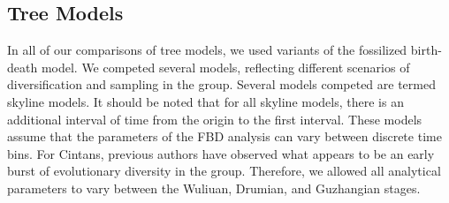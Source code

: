 \documentclass{article}
\begin{document}
\subsection{Tree Models}

In all of our comparisons of tree models, we used variants of the fossilized birth-death model. We competed several models, reflecting different scenarios of diversification and sampling in the group.
Several models competed are termed skyline models.
It should be noted that for all skyline models, there is an additional interval of time from the origin to the first interval.
These models assume that the parameters of the FBD analysis can vary between discrete time bins.
For Cintans, previous authors have observed what appears to be an early burst of evolutionary diversity in the group.
Therefore, we allowed all analytical parameters to vary between the Wuliuan, Drumian, and Guzhangian stages.
\end{document}
